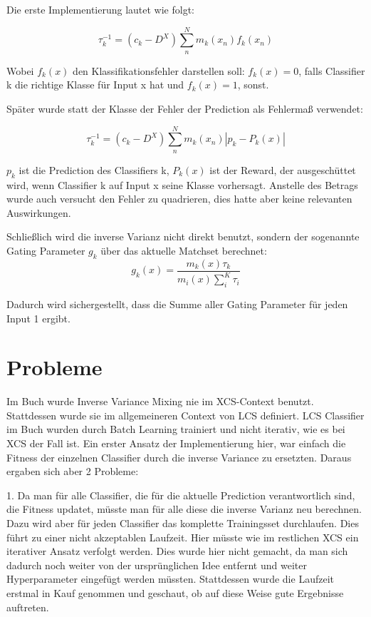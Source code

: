 \documentclass[10pt]{ocsmnar}
\begin{document}
Die erste Implementierung lautet wie folgt: 

$$ \tau_{k}^{-1} = (c_{k} - D^{X}) \sum_{n}^{N} m_{k}(x_{n})f_{k}(x_{n}) $$

Wobei $f_{k}(x)$ den Klassifikationsfehler darstellen soll: $f_{k}(x) = 0$, falls Classifier k die richtige Klasse für Input x hat und $f_{k}(x) = 1$, sonst. 

Später wurde statt der Klasse der Fehler der Prediction als Fehlermaß verwendet:

$$ \tau_{k}^{-1} = (c_{k} - D^{X}) \sum_{n}^{N} m_{k}(x_{n}) |p_{k} - P_{k}(x)|  $$

$p_{k}$ ist die Prediction des Classifiers k, $P_{k}(x)$ ist der Reward, der ausgeschüttet wird, wenn Classifier k auf Input x seine Klasse vorhersagt. 
Anstelle des Betrags wurde auch versucht den Fehler zu quadrieren, dies hatte aber keine relevanten Auswirkungen.

Schließlich wird die inverse Varianz nicht direkt benutzt, sondern  der sogenannte Gating Parameter $g_{k}$ über das aktuelle Matchset berechnet: 
$$ g_k(x) = \frac{m_k(x)\tau_k}{m_i(x)\sum_i^K \tau_i}$$

Dadurch wird sichergestellt, dass die Summe aller Gating Parameter für jeden Input 1 ergibt. 




\section{Probleme}
Im Buch wurde Inverse Variance Mixing nie im XCS-Context benutzt. Stattdessen wurde sie im allgemeineren Context von LCS definiert. LCS Classifier im Buch wurden durch Batch Learning trainiert und nicht iterativ, wie es bei XCS der Fall ist. 
Ein erster Ansatz der Implementierung hier, war einfach die Fitness der einzelnen Classifier durch die inverse Variance zu ersetzten. 
Daraus ergaben sich aber 2 Probleme: 

1. Da man für alle Classifier, die für die aktuelle Prediction verantwortlich sind, die Fitness updatet, müsste man für alle diese die inverse Varianz neu berechnen. Dazu wird aber für jeden Classifier das komplette Trainingsset durchlaufen. Dies führt zu einer nicht akzeptablen Laufzeit. Hier müsste wie im restlichen XCS ein iterativer Ansatz verfolgt werden. Dies wurde hier nicht gemacht, da man sich dadurch noch weiter von der ursprünglichen Idee entfernt und weiter Hyperparameter eingefügt werden müssten. 
Stattdessen wurde die Laufzeit erstmal in Kauf genommen und geschaut, ob auf diese Weise gute Ergebnisse auftreten.  
\end{document}
